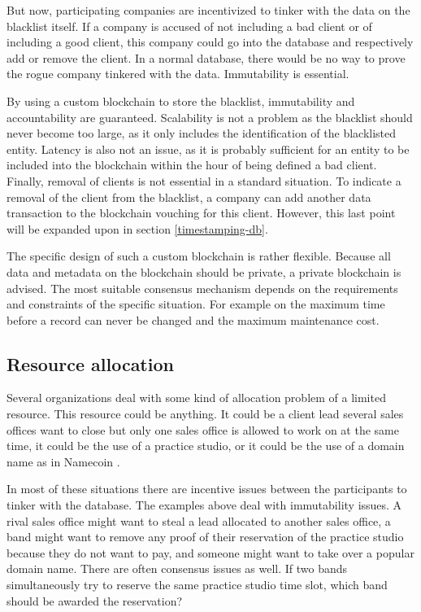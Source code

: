 But now, participating companies are incentivized to tinker with the data on the blacklist itself. If a company is accused of not including a bad client or of including a good client, this company could go into the database and respectively add or remove the client. In a normal database, there would be no way to prove the rogue company tinkered with the data. Immutability is essential.

By using a custom blockchain to store the blacklist, immutability and accountability are guaranteed. Scalability is not a problem as the blacklist should never become too large, as it only includes the identification of the blacklisted entity. Latency is also not an issue, as it is probably sufficient for an entity to be included into the blockchain within the hour of being defined a bad client. Finally, removal of clients is not essential in a standard situation. To indicate a removal of the client from the blacklist, a company can add another data transaction to the blockchain vouching for this client. However, this last point will be expanded upon in section \ref{timestamping-db}.

The specific design of such a custom blockchain is rather flexible. Because all data and metadata on the blockchain should be private, a private blockchain is advised. The most suitable consensus mechanism depends on the requirements and constraints of the specific situation. For example on the maximum time before a record can never be changed and the maximum maintenance cost.

\subsection{Resource allocation}

Several organizations deal with some kind of allocation problem of a limited resource. This resource could be anything. It could be a client lead several sales offices want to close but only one sales office is allowed to work on at the same time, it could be the use of a practice studio, or it could be the use of a domain name as in Namecoin \cite{namecoin-whitepaper}. 

In most of these situations there are incentive issues between the participants to tinker with the database. The examples above deal with immutability issues. A rival sales office might want to steal a lead allocated to another sales office, a band might want to remove any proof of their reservation of the practice studio because they do not want to pay, and someone might want to take over a popular domain name. There are often consensus issues as well. If two bands simultaneously try to reserve the same practice studio time slot, which band should be awarded the reservation?

